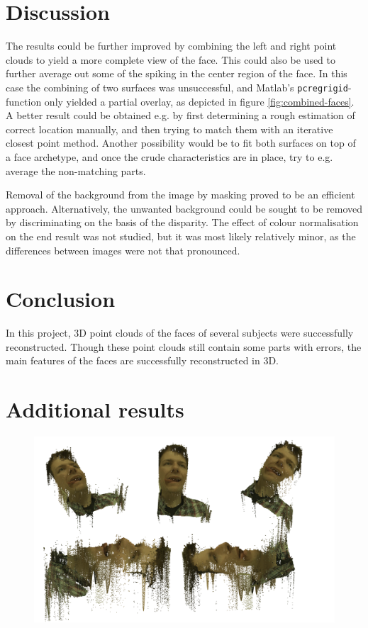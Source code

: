 \documentclass[journal]{IEEEtran}
\begin{document}
\section{Discussion}

The results could be further improved by combining the left and right point clouds to yield a more complete view of the face. 
This could also be used to further average out some of the spiking in the center region of the face.
In this case the combining of two surfaces was unsuccessful, and Matlab's \texttt{pcregrigid}-function only yielded a partial overlay, as depicted in figure \ref{fig:combined-faces}.
A better result could be obtained e.g. by first determining a rough estimation of correct location manually, and then trying to match them with an iterative closest point method.
Another possibility would be to fit both surfaces on top of a face archetype, and once the crude characteristics are in place, try to e.g. average the non-matching parts.

Removal of the background from the image by masking proved to be an efficient approach. 
Alternatively, the unwanted background could be sought to be removed by discriminating on the basis of the disparity. 
The effect of colour normalisation on the end result was not studied, but it was most likely relatively minor, as the differences between images were not that pronounced.


\section{Conclusion}
In this project, 3D point clouds of the faces of several subjects were successfully reconstructed. Though these point clouds still contain some parts with errors, the main features of the faces are successfully reconstructed in 3D.

\appendices
\section{Additional results}
\FloatBarrier


\begin{figure}[h]
    \centering
    \includegraphics[width=0.8\linewidth]{result_S1_356}
	\label{fig:result_S1_356}
\end{figure}
\end{document}
